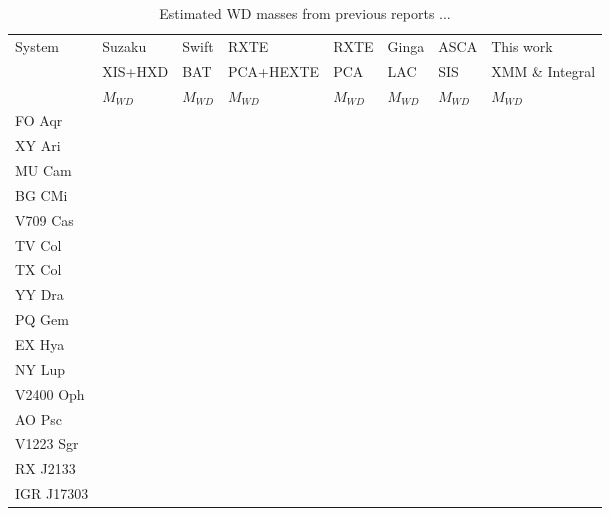 \documentclass[oneside,a4paper,11pt]{report}
\begin{document}
\begin{table}
\begin{center}
 

\caption{Estimated WD masses from previous reports ...}
\begin{tabular}{llllllll}
\hline
\hline
System & Suzaku & Swift & RXTE & RXTE & Ginga & ASCA& This work  \\
       & XIS+HXD & BAT& PCA+HEXTE & PCA & LAC & SIS & XMM \& Integral                     \\
       & $M_{WD}$ &$M_{WD}$ &$M_{WD} $&$M_{WD}$ &$M_{WD}$ &$M_{WD}$ &$M_{WD}$ \\
\hline
 FO Aqr      &         &        &          &     &      &         &           \\
 XY Ari      &         &        &          &     &      &         &           \\
 MU Cam      &         &        &          &     &      &         &           \\
 BG CMi&         &        &          &     &      &         &           \\
 V709 Cas&         &        &          &     &      &         &           \\
 TV Col&         &        &          &     &      &         &           \\
 TX Col&         &        &          &     &      &         &           \\
 YY Dra&         &        &          &     &      &         &           \\
 PQ Gem&         &        &          &     &      &         &           \\
 EX Hya&         &        &          &     &      &         &           \\
 NY Lup&         &        &          &     &      &         &           \\
 V2400 Oph&         &        &          &     &      &         &           \\
 AO Psc&         &        &          &     &      &         &           \\
 V1223 Sgr&         &        &          &     &      &         &           \\
 RX J2133&         &        &          &     &      &         &           \\
 IGR J17303&         &        &          &     &      &         &           \\

\hline
\end{tabular}

\end{center}
\end{table}
\end{document}
